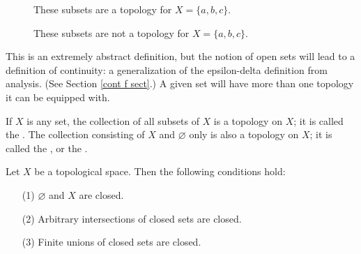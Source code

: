\begin{marginfigure}
	\begin{subfigure}{2in}
		\centering
		\caption{These subsets are a topology for $X = \{ a, b, c 
		\}$.}\label{top example}
	\end{subfigure}
	\begin{subfigure}{2in}
		\centering
		\caption{These subsets are not a topology for $X = \{ a, 
		b, c \}$.}\label{top nonexample}
	\end{subfigure}
\end{marginfigure}

This is an extremely abstract definition, but the notion of open 
sets will lead to a definition of continuity: a 
generalization of the epsilon-delta definition from analysis. 
(See Section \ref{cont f sect}.) A given set will have more than 
one topology it 
can be equipped with.

\begin{example}
	If $X$ is any set, the collection of all subsets of $X$ is a 
	topology on $X$; it is called the . The collection 
	consisting of $X$ and $\varnothing$ only is also a topology 
	on $X$; it is called the , or the 
	.
\end{example}

\begin{theorem}
	Let $X$ be a topological space. Then the following conditions 
	hold:
	\begin{enumerate}
		\item[(1)] $\varnothing$ and $X$ are closed.
		
		\item[(2)] Arbitrary intersections of closed sets are 
		closed.
		
		\item[(3)] Finite unions of closed sets are closed.
	\end{enumerate}
\end{theorem}


